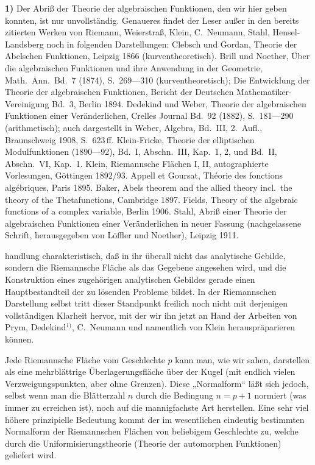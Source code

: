 \documentclass{article}
\begin{document}
\textbf{1)} Der Abriß der Theorie der algebraischen Funktionen, den wir hier geben konnten, ist nur unvollständig. Genaueres findet der Leser außer in den bereits zitierten Werken von Riemann, Weierstraß, Klein, C.~Neumann, Stahl, Hensel-Landsberg noch in folgenden Darstellungen: Clebsch und Gordan, Theorie der Abelschen Funktionen, Leipzig 1866 (kurventheoretisch). Brill und Noether, Über die algebraischen Funktionen und ihre Anwendung in der Geometrie, Math.\ Ann.\ Bd.~7 (1874), S.~269---310 (kurventheoretisch); Die Entwicklung der Theorie der algebraischen Funktionen, Bericht der Deutschen Mathematiker-Vereinigung Bd.~3, Berlin 1894. Dedekind und Weber, Theorie der algebraischen Funktionen einer Veränderlichen, Crelles Journal Bd.~92 (1882), S.~181---290 (arithmetisch); auch dargestellt in Weber, Algebra, Bd.~III, 2.\ Aufl., Braunschweig 1908, S.~623\,ff. Klein-Fricke, Theorie der elliptischen Modulfunktionen (1890---92), Bd.~I, Abschn.~III, Kap.~1, 2, und Bd.~II, Abschn.~VI, Kap.~1. Klein, Riemannsche Flächen I, II, autographierte Vorlesungen, Göttingen 1892/93. Appell et Goursat, Théorie des fonctions algébriques, Paris 1895. Baker, Abels theorem and the allied theory incl.\ the theory of the Thetafunctions, Cambridge 1897. Fields, Theory of the algebraic functions of a complex variable, Berlin 1906. Stahl, Abriß einer Theorie der algebraischen Funktionen einer Veränderlichen in neuer Fassung (nachgelassene Schrift, herausgegeben von Löffler und Noether), Leipzig 1911.

handlung charakteristisch, daß in ihr überall nicht das analytische Gebilde, sondern die Riemannsche Fläche als das Gegebene angesehen wird, und die Konstruktion eines zugehörigen analytischen Gebildes gerade einen Hauptbestandteil der zu lösenden Probleme bildet. In der Riemannschen Darstellung selbst tritt dieser Standpunkt freilich noch nicht mit derjenigen vollständigen Klarheit hervor, mit der wir ihn jetzt an Hand der Arbeiten von Prym, Dedekind${}^{1)}$, C.~Neumann und namentlich von Klein herauspräparieren können.

Jede Riemannsche Fläche vom Geschlechte $p$ kann man, wie wir sahen, darstellen als eine mehrblättrige Überlagerungsfläche über der Kugel (mit endlich vielen Verzweigungspunkten, aber ohne Grenzen). Diese „Normalform“ läßt sich jedoch, selbst wenn man die Blätterzahl $n$ durch die Bedingung $n = p + 1$ normiert (was immer zu erreichen ist), noch auf die mannigfachste Art herstellen. Eine sehr viel höhere prinzipielle Bedeutung kommt der im wesentlichen eindeutig bestimmten Normalform der Riemannschen Flächen von beliebigem Geschlechte zu, welche durch die Uniformisierungstheorie (Theorie der automorphen Funktionen) geliefert wird.
\end{document}
